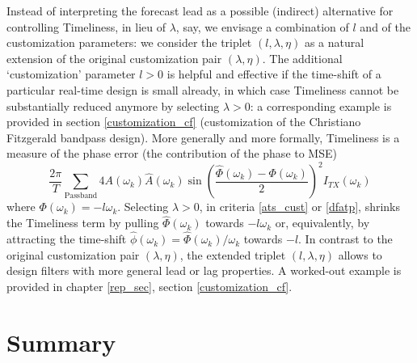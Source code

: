 \documentclass[a4paper]{book}
\begin{document}
Instead of interpreting the forecast lead as a possible (indirect) alternative for controlling Timeliness, in lieu of $\lambda$, say, we envisage a combination of $l$ and of the customization parameters: we consider the triplet $(l, \lambda, \eta)$ as a natural extension of the original customization pair $(\lambda,\eta)$. The additional `customization' parameter $l>0$ is helpful and effective if the time-shift of a particular real-time design is small already, in which case Timeliness cannot be substantially reduced anymore by selecting $\lambda>0$: a corresponding example is provided in section \ref{customization_cf} (customization of the Christiano Fitzgerald bandpass design). More generally and more formally, Timeliness is a measure of the phase error (the contribution of the phase to MSE)
\[
\frac{2\pi}{ T}  \sum_{\textrm{Passband}} 4A(\omega_k)\hat{A}(\omega_k)\sin\left(\frac{\hat{\Phi}(\omega_k)-\Phi(\omega_k)}{2}\right)^2
I_{TX}(\omega_k) 
\]
where $\Phi(\omega_k)=-l \omega_k$. Selecting $\lambda>0$, in criteria \ref{ats_cust} or \ref{dfatp}, shrinks the Timeliness term by pulling $\hat{\Phi}(\omega_k)$ towards $-l \omega_k$ or, equivalently, by attracting the time-shift $\hat{\phi}(\omega_k)=\hat{\Phi}(\omega_k)/\omega_k$ towards $-l$. In contrast to the original customization pair $(\lambda,\eta)$, the extended triplet $(l,\lambda,\eta)$ allows to design filters with more general lead or lag properties. A worked-out example is provided in chapter \ref{rep_sec}, section \ref{customization_cf}.





\section{Summary}
\end{document}
